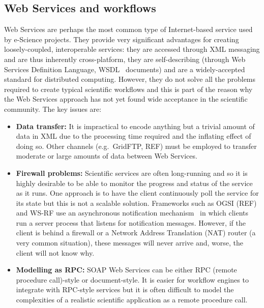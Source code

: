 \documentclass{llncs}
\begin{document}
\subsection{Web Services and workflows}\label{sec:webservices}
Web Services are perhaps the most common type of Internet-based service used by e-Science projects.  They provide very significant advantages for creating loosely-coupled, interoperable services: they are accessed through XML messaging and are thus inherently cross-platform, they are self-describing (through Web Services Definition Language, WSDL~\cite{WSDL} documents) and are a widely-accepted standard for distributed computing.  However, they do not solve all the problems required to create typical scientific workflows and this is part of the reason why the Web Services approach has not yet found wide acceptance in the scientific community.  The key issues are:

\begin{itemize}
	\item {\bf Data transfer:} It is impractical to encode anything but a trivial amount of data in XML due to the processing time required and the inflating effect of doing so.  Other channels (e.g.\ GridFTP, REF) must be employed to transfer moderate or large amounts of data between Web Services.
	\item {\bf Firewall problems:} Scientific services are often long-running and so it is highly desirable to be able to monitor the progress and status of the service as it runs.  One approach is to have the client continuously poll the service for its state but this is not a scalable solution.  Frameworks such as OGSI (REF) and WS-RF use an asynchronous notification mechanism~\cite{wsrf-notification} in which clients run a server process that listens for notification messages.  However, if the client is behind a firewall or a Network Address Translation (NAT) router (a very common situation), these messages will never arrive and, worse, the client will not know why.
	\item {\bf Modelling as RPC:} SOAP Web Services can be either RPC (remote procedure call)-style or document-style.  It is easier for workflow engines to integrate with RPC-style services but it is often difficult to model the complexities of a realistic scientific application as a remote procedure call.
\end{itemize}
\end{document}
